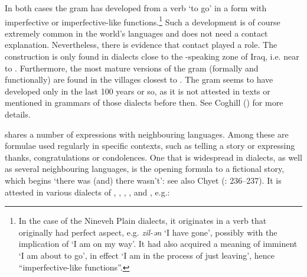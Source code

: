 \documentclass[output=paper]{langsci/langscibook}
\begin{document}

In both cases the gram has developed from a verb ‘to go’ in a form with imperfective or imperfective-like functions.\footnote{In the case of the Nineveh Plain dialects, it originates in a verb that originally had perfect aspect, e.g. \textit{zil-ən} ‘I have gone’, possibly with the implication of ‘I am on my way’. It had also acquired a meaning of imminent  ‘I am about to go’, in effect ‘I am in the process of just leaving’, hence ``imperfective-like functions''.} Such a development is of course extremely common in the world’s languages and does not need a contact explanation. Nevertheless, there is evidence that contact played a role. The construction is only found in  dialects close to the -speaking zone of Iraq, i.e. near to . Furthermore, the most mature versions of the gram (formally and functionally) are found in the villages closest to . The gram seems to have developed only in the last 100 years or so, as it is not attested in texts or mentioned in grammars of those dialects before then. See Coghill (\citeyear{Coghill2010,Coghill2012}) for more details.

 shares a number of  expressions with neighbouring languages. Among these are formulae used regularly in specific contexts, such as telling a story or expressing thanks, congratulations or condolences. One that is widespread in  dialects, as well as several neighbouring languages, is the opening formula to a fictional story, which begins ‘there was (and) there wasn’t’: see also Chyet (\citeyear{Chyet1995}: 236–237). It is attested in various dialects of , , , ,  and , e.g.:
\end{document}
